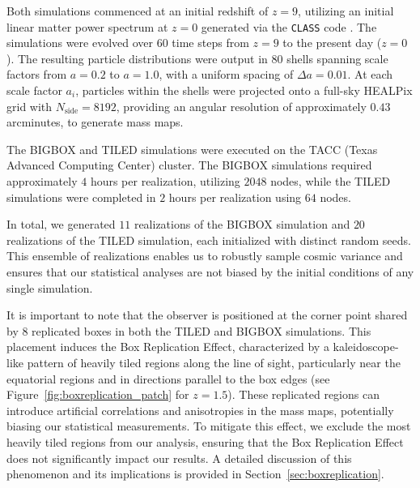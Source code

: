 Both simulations commenced at an initial redshift of $z = 9$, utilizing an initial linear matter power spectrum at $z = 0$ generated via the \texttt{CLASS} code \citep{2011JCAP...07..034B}. The simulations were evolved over $60$ time steps from $z = 9$ to the present day ($z = 0$). The resulting particle distributions were output in $80$ shells spanning scale factors from $a = 0.2$ to $a = 1.0$, with a uniform spacing of $\Delta a = 0.01$. At each scale factor $a_i$, particles within the shells were projected onto a full-sky HEALPix grid \citep{Górski_2005} with $N_{\text{side}} = 8192$, providing an angular resolution of approximately $0.43$ arcminutes, to generate mass maps.

The BIGBOX and TILED simulations were executed on the TACC (Texas Advanced Computing Center) cluster. The BIGBOX simulations required approximately $4$ hours per realization, utilizing $2048$ nodes, while the TILED simulations were completed in $2$ hours per realization using $64$ nodes.

In total, we generated $11$ realizations of the BIGBOX simulation and $20$ realizations of the TILED simulation, each initialized with distinct random seeds. This ensemble of realizations enables us to robustly sample cosmic variance and ensures that our statistical analyses are not biased by the initial conditions of any single simulation.

It is important to note that the observer is positioned at the corner point shared by $8$ replicated boxes in both the TILED and BIGBOX simulations. This placement induces the Box Replication Effect, characterized by a kaleidoscope-like pattern of heavily tiled regions along the line of sight, particularly near the equatorial regions and in directions parallel to the box edges (see Figure~\ref{fig:boxreplication_patch} for $z = 1.5$). These replicated regions can introduce artificial correlations and anisotropies in the mass maps, potentially biasing our statistical measurements. To mitigate this effect, we exclude the most heavily tiled regions from our analysis, ensuring that the Box Replication Effect does not significantly impact our results. A detailed discussion of this phenomenon and its implications is provided in Section~\ref{sec:boxreplication}.

